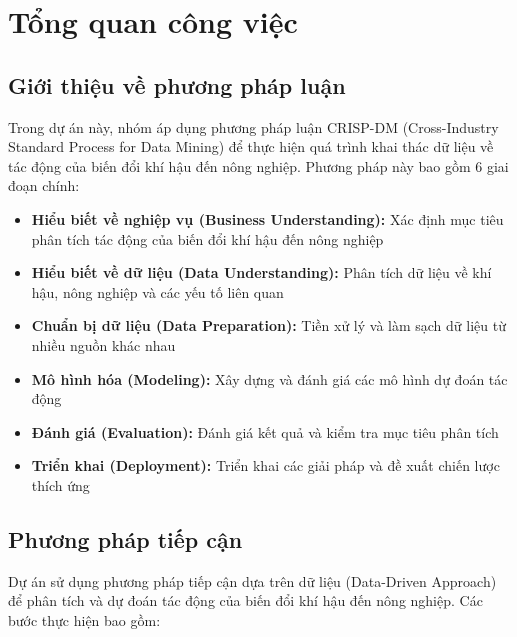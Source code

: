 \section{Tổng quan công việc}

\subsection{Giới thiệu về phương pháp luận}

\hspace{0.5cm}Trong dự án này, nhóm áp dụng phương pháp luận CRISP-DM (Cross-Industry Standard Process for Data Mining) để thực hiện quá trình khai thác dữ liệu về tác động của biến đổi khí hậu đến nông nghiệp. Phương pháp này bao gồm 6 giai đoạn chính:

\begin{itemize}
    \item \textbf{Hiểu biết về nghiệp vụ (Business Understanding):} Xác định mục tiêu phân tích tác động của biến đổi khí hậu đến nông nghiệp
    \item \textbf{Hiểu biết về dữ liệu (Data Understanding):} Phân tích dữ liệu về khí hậu, nông nghiệp và các yếu tố liên quan
    \item \textbf{Chuẩn bị dữ liệu (Data Preparation):} Tiền xử lý và làm sạch dữ liệu từ nhiều nguồn khác nhau
    \item \textbf{Mô hình hóa (Modeling):} Xây dựng và đánh giá các mô hình dự đoán tác động
    \item \textbf{Đánh giá (Evaluation):} Đánh giá kết quả và kiểm tra mục tiêu phân tích
    \item \textbf{Triển khai (Deployment):} Triển khai các giải pháp và đề xuất chiến lược thích ứng
\end{itemize}

\subsection{Phương pháp tiếp cận}

\hspace{0.5cm}Dự án sử dụng phương pháp tiếp cận dựa trên dữ liệu (Data-Driven Approach) để phân tích và dự đoán tác động của biến đổi khí hậu đến nông nghiệp. Các bước thực hiện bao gồm:

